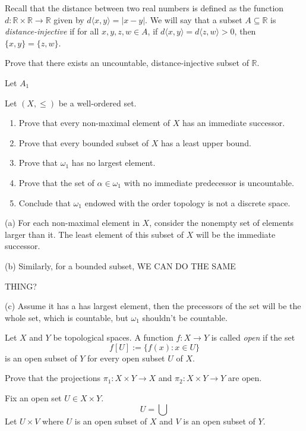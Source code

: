 \documentclass[../main.tex]{subfiles}
\begin{document}
\begin{problem}[8]
Recall that the distance between two real numbers is defined as the function $d: \mathbb{R} \times \mathbb{R} \to \mathbb{R}$ given by $d\langle x, y \rangle = |x - y|$.
We will say that a subset $A \subseteq \mathbb{R}$ is \textit{distance-injective} if for all $x, y, z, w \in A$, if $d\langle x, y \rangle = d\langle z, w \rangle > 0$, then $\{ x, y \} = \{z, w \}$.

Prove that there exists an uncountable, distance-injective subset of $\mathbb{R}$.
\end{problem}
Let $A_1$

\begin{problem}[9]
Let $(X, \le)$ be a well-ordered set.
\begin{enumerate}[label=(\alph*)]
	\item Prove that every non-maximal element of $X$ has an immediate successor.
	\item Prove that every bounded subset of $X$ has a least upper bound.
	\item Prove that $\omega_1$ has no largest element.
	\item Prove that the set of $\alpha \in \omega_1$ with no immediate predecessor is uncountable.
	\item Conclude that $\omega_1$ endowed with the order topology is not a discrete space.
\end{enumerate}
\end{problem}

(a) For each non-maximal
element in $X$, consider the nonempty set of elements larger than it.
The least element of this subset of $X$ will be the immediate successor.

(b) Similarly, for a bounded subset, WE CAN DO THE SAME

THING?

(c) Assume it has a has largest element, then the precessors of the set will be the whole set, which is countable, but $\omega_1$ shouldn't be countable.

\begin{problem}[10]
Let $X$ and $Y$ be topological spaces.
A function $f : X \to Y$ is called \textit{open} if the set
\[
	f[U] := \{ f(x) : x \in U \}
\]
is an open subset of $Y$ for every open subset $U$ of $X$.

Prove that the projections $\pi_1 : X \times Y \to X$ and $\pi_2 : X \times Y \to Y$ are open.
\end{problem}
Fix an open set $U \in X \times Y$.
\[
	U = \bigcup
\]
Let $U \times V$ where $U$ is an open subset of $X$ and $V$ is an open subset of $Y$.
\end{document}
